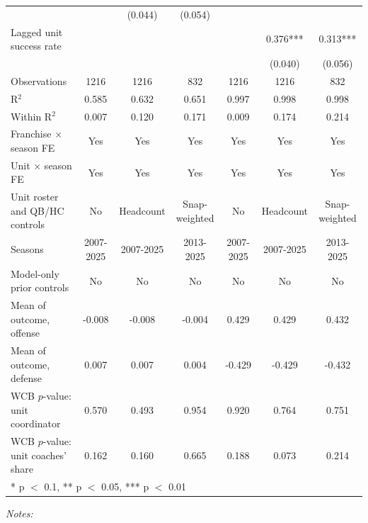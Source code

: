\begin{table}[!h]
{\begin{threeparttable}
\begin{tabular}[t]{lcccccc}
 &  & (0.044) & (0.054) &  &  & \\
Lagged unit success rate &  &  &  &  & 0.376*** & 0.313***\\
 &  &  &  &  & (0.040) & (0.056)\\
\midrule
Observations & 1216 & 1216 & 832 & 1216 & 1216 & 832\\
R$^2$ & 0.585 & 0.632 & 0.651 & 0.997 & 0.998 & 0.998\\
Within R$^2$ & 0.007 & 0.120 & 0.171 & 0.009 & 0.174 & 0.214\\
Franchise $\times$ season FE & Yes & Yes & Yes & Yes & Yes & Yes\\
Unit $\times$ season FE & Yes & Yes & Yes & Yes & Yes & Yes\\
Unit roster and QB/HC controls & No & Headcount & Snap-weighted & No & Headcount & Snap-weighted\\
Seasons & 2007-2025 & 2007-2025 & 2013-2025 & 2007-2025 & 2007-2025 & 2013-2025\\
Model-only prior controls & No & No & No & No & No & No\\
Mean of outcome, offense & -0.008 & -0.008 & -0.004 & 0.429 & 0.429 & 0.432\\
Mean of outcome, defense & 0.007 & 0.007 & 0.004 & -0.429 & -0.429 & -0.432\\
WCB $p$-value: unit coordinator & 0.570 & 0.493 & 0.954 & 0.920 & 0.764 & 0.751\\
WCB $p$-value: unit coaches' share & 0.162 & 0.160 & 0.665 & 0.188 & 0.073 & 0.214\\
\bottomrule
\multicolumn{7}{l}{\rule{0pt}{1em}* p $<$ 0.1, ** p $<$ 0.05, *** p $<$ 0.01}\\
\end{tabular}
\begin{tablenotes}[para]
\item \textit{Notes:} 

\end{tablenotes}
\end{threeparttable}}
\end{table}
